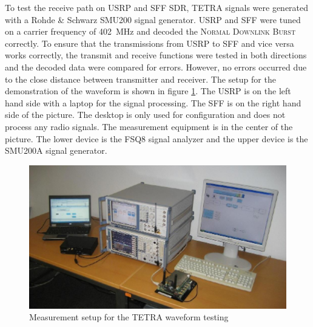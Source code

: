 To test the receive path on USRP and SFF SDR, TETRA signals were generated with a Rohde \& Schwarz SMU200 signal generator. USRP and SFF were tuned on a carrier frequency of \SI{402}{MHz} and decoded the \textsc{Normal Downlink Burst} correctly. To ensure that the transmissions from USRP to SFF and vice versa works correctly, the transmit and receive functions were tested in both directions and the decoded data were compared for errors. However, no errors occurred due to the close distance between transmitter and receiver. The setup for the demonstration of the waveform is shown in figure \ref{fig:Interoperability}. The USRP is on the left hand side with a laptop for the signal processing. The SFF is on the right hand side of the picture. The desktop is only used for configuration and does not process any radio signals. The measurement equipment is in the center of the picture. The lower device is the FSQ8 signal analyzer and the upper device is the SMU200A signal generator.

\begin{figure}[htb]
	\centering
		\includegraphics[width=1.00\textwidth]{../kapitel05/figures/Interoperability_demo_small.pdf}
	\caption{Measurement setup for the TETRA waveform testing}
	\label{fig:Interoperability}
\end{figure}






